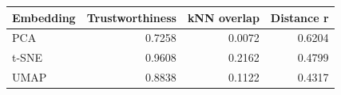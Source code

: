 \begin{tabular}{lrrr}
\toprule
Embedding & Trustworthiness & kNN overlap & Distance r \\
\midrule
PCA & 0.7258 & 0.0072 & 0.6204 \\
t-SNE & 0.9608 & 0.2162 & 0.4799 \\
UMAP & 0.8838 & 0.1122 & 0.4317 \\
\bottomrule
\end{tabular}
